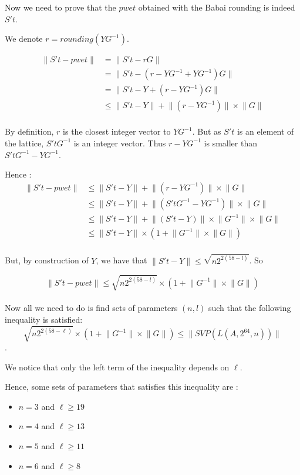 \documentclass[preprint]{iacrtrans}
\begin{document}
Now we need to prove that the \(pwet\) obtained with the Babai rounding is indeed \(S't\).

We denote \(r = rounding(YG^{-1}) \).

\begin{align*}
\lVert S't - pwet \rVert &= \lVert S't - rG \rVert \\
&= \lVert S't - (r-YG^{-1} + YG^{-1})G \rVert\\
&= \lVert S't - Y + (r-YG^{-1})G \rVert\\
&\leqslant \lVert S't - Y \rVert + \lVert(r-YG^{-1})\rVert \times \lVert G\rVert\\	
\end{align*}

By definition, \(r\) is the closest integer vector to \(YG^{-1}\). But as \(S't\) is an element of the lattice, \(S'tG^{-1}\) is an integer vector. Thus \(r-YG^{-1}\) is smaller than \(S'tG^{-1}-YG^{-1}\).

Hence :
\begin{align*}
\lVert S't - pwet \rVert &\leqslant \lVert S't - Y \rVert + \lVert(r-YG^{-1})\rVert \times \lVert G\rVert\\	
&\leqslant \lVert S't - Y \rVert + \lVert(S'tG^{-1}-YG^{-1})\rVert \times \lVert G\rVert\\	
&\leqslant \lVert S't - Y \rVert + \lVert(S't-Y)\rVert \times \lVert G^{-1} \rVert  \times \lVert G\rVert\\
& 	\leqslant \lVert S't - Y \rVert \times (1 +\lVert G^{-1} \rVert  \times \lVert G\rVert )\\
\end{align*}

But, by construction of \(Y\), we have that \(\lVert S't - Y \rVert \leqslant \sqrt{n2^{2(58-l)}} \). So

\[ \lVert S't - pwet \rVert \leqslant \sqrt{n2^{2(58-l)}}\times (1 +\lVert G^{-1} \rVert  \times \lVert G\rVert )\]\\




Now all we need to do is find sets of parameters \((n,l)\) such that the following inequality is satisfied: 
\[\sqrt{n2^{2(58-\ell)}} \times (1 +\lVert G^{-1} \rVert  \times \lVert G\rVert) \leqslant \lVert SVP(L(A,2^{64},n))\rVert \].

We notice that only the left term of the inequality depends on \(\ell\).

Hence, some sets of parameters that satisfies this inequality are :
\begin{itemize}
	\item \(n = 3\) and \(\ell \geqslant 19\)
	\item \(n = 4\) and \(\ell \geqslant 13\)
	\item \(n = 5\) and \(\ell \geqslant 11\)
	\item \(n = 6\) and \(\ell \geqslant 8\)
\end{itemize}
\end{document}
